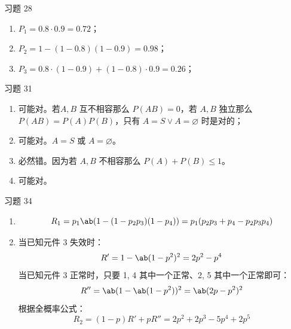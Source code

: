 \begin{problem}
    习题 28
    \begin{solution}
        \begin{enumerate}
            \item[\textbf{1)}] $P_1 = 0.8 \cdot 0.9 = 0.72$；
            \item[\textbf{2)}] $P_2 = 1 - (1 - 0.8) (1 - 0.9) = 0.98$；
            \item[\textbf{3)}] $P_3 = 0.8 \cdot (1 - 0.9) + (1 - 0.8) \cdot 0.9 = 0.26$；
        \end{enumerate}
    \end{solution}
\end{problem}

\begin{problem}
    习题 31
    \begin{solution}
        \begin{enumerate}
            \item[\textbf{1)}] 可能对。若$A, B$ 互不相容那么 $P(A B) = 0$，若 $A, B$ 独立那么 $P(A B) = P(A) P(B)$，只有 $A = S \lor A = \varnothing$ 时是对的；
            \item[\textbf{2)}] 可能对。$A = S$ 或 $A = \varnothing$。
            \item[\textbf{3)}] 必然错。因为若 $A, B$ 不相容那么 $P(A) + P(B) \le 1$。
            \item[\textbf{4)}] 可能对。 
        \end{enumerate}
    \end{solution}
\end{problem}

\begin{problem}
    习题 34
    \begin{solution}
        \begin{enumerate}
            \item[\textbf{1)}]
            $$
            R_1 = p_1 \ab(1 - (1 - p_2 p_3) (1 - p_4)) = p_1 (p_2 p_3 + p_4 - p_2 p_3 p_4)
            $$
            \item[\textbf{2)}] 当已知元件 3 失效时：
            $$
            R' = 1 - \ab(1 - p^2)^2 = 2 p^2 - p^4
            $$
            当已知元件 3 正常时，只要 1, 4 其中一个正常、2, 5 其中一个正常即可：
            $$
            R'' = \ab(1 - \ab(1 - p^2))^2 = \ab(2 p - p^2)^2
            $$
            根据全概率公式：
            $$
            R_2 = (1 - p) R' + p R'' = 2 p^2 + 2 p^3 - 5 p^4 + 2 p^5
            $$
        \end{enumerate}
    \end{solution}
\end{problem}

